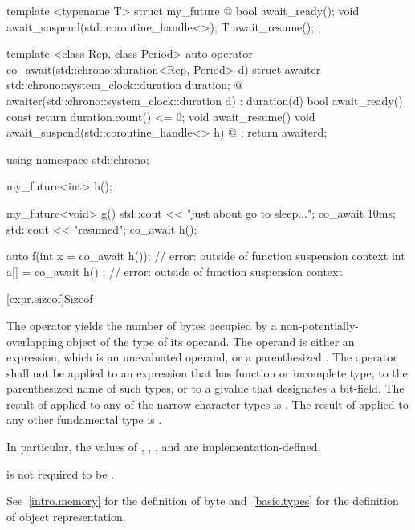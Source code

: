\pnum
\begin{example}
\begin{codeblock}
template <typename T>
struct my_future {
  @\commentellip@
  bool await_ready();
  void await_suspend(std::coroutine_handle<>);
  T await_resume();
};

template <class Rep, class Period>
auto operator co_await(std::chrono::duration<Rep, Period> d) {
  struct awaiter {
    std::chrono::system_clock::duration duration;
    @\commentellip@
    awaiter(std::chrono::system_clock::duration d) : duration(d) {}
    bool await_ready() const { return duration.count() <= 0; }
    void await_resume() {}
    void await_suspend(std::coroutine_handle<> h) { @\commentellip@ }
  };
  return awaiter{d};
}

using namespace std::chrono;

my_future<int> h();

my_future<void> g() {
  std::cout << "just about go to sleep...\n";
  co_await 10ms;
  std::cout << "resumed\n";
  co_await h();
}

auto f(int x = co_await h());   // error:  outside of function suspension context
int a[] = { co_await h() };     // error:  outside of function suspension context
\end{codeblock}
\end{example}

[expr.sizeof]{Sizeof}

\pnum
{}%
%
%
The  operator yields the number of bytes
occupied by a non-potentially-overlapping object of the type
of its operand. The operand is either an expression,
which is an unevaluated operand, or a parenthesized
.
%
The  operator shall not be applied to an expression that
has function or incomplete type,
to the parenthesized name of such
types, or to a glvalue that designates a bit-field.
The result of 
applied to any of the narrow character types is .
The result of
 applied to any other fundamental
type is .
\begin{note}
In particular, the values of , ,
, and  are
implementation-defined.
\begin{footnote}
 is not required to be .
\end{footnote}
\end{note}
\begin{note}
See~\ref{intro.memory} for the definition of byte
and~\ref{basic.types} for the definition of object representation.
\end{note}

